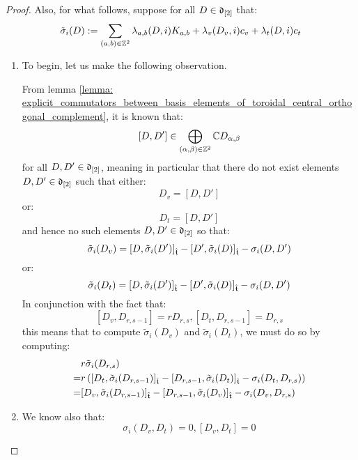 \begin{proof}
                Also, for what follows, suppose for all $D \in \mathfrak{d}_{[2]}$ that:
                    $$\tilde{\sigma}_i(D) := \sum_{(a, b) \in \mathbb{Z}^2} \lambda_{a, b}(D, i) K_{a, b} + \lambda_v(D_v, i) c_v + \lambda_t(D, i) c_t$$
                \begin{enumerate}
                    \item To begin, let us make the following observation.
                    
                    From lemma \ref{lemma: explicit_commutators_between_basis_elements_of_toroidal_central_orthogonal_complement}, it is known that:
                        $$[D, D'] \in \bigoplus_{(\alpha, \beta) \in \mathbb{Z}^2} \mathbb{C} D_{\alpha, \beta}$$
                    for all $D, D' \in \mathfrak{d}_{[2]}$, meaning in particular that there do not exist elements $D, D' \in \mathfrak{d}_{[2]}$ such that either:
                        $$D_v = [D, D']$$
                    or:
                        $$D_t = [D, D']$$
                    and hence no such elements $D, D' \in \mathfrak{d}_{[2]}$ so that:
                        $$\tilde{\sigma}_i(D_v) = [D, \tilde{\sigma}_i(D')]_{\hat{\mathfrak{t}}} - [D', \tilde{\sigma}_i(D)]_{\hat{\mathfrak{t}}} - \sigma_i(D, D')$$
                    or:
                        $$\tilde{\sigma}_i(D_t) = [D, \tilde{\sigma}_i(D')]_{\hat{\mathfrak{t}}} - [D', \tilde{\sigma}_i(D)]_{\hat{\mathfrak{t}}} - \sigma_i(D, D')$$
                    In conjunction with the fact that:
                        $$[D_v, D_{r, s - 1}] = r D_{r, s}, [D_t, D_{r, s - 1}] = D_{r, s}$$
                    this means that to compute $\tilde{\sigma}_i(D_v)$ and $\tilde{\sigma}_i(D_t)$, we must do so by computing:
                        $$
                            \begin{aligned}
                                & r\tilde{\sigma}_i(D_{r, s})
                                \\
                                = & r\left( [D_t, \tilde{\sigma}_i(D_{r, s - 1})]_{\hat{\mathfrak{t}}} - [D_{r, s - 1}, \tilde{\sigma}_i(D_t)]_{\hat{\mathfrak{t}}} - \sigma_i(D_t, D_{r, s}) \right)
                                \\
                                = & [D_v, \tilde{\sigma}_i(D_{r, s - 1})]_{\hat{\mathfrak{t}}} - [D_{r, s - 1}, \tilde{\sigma}_i(D_v)]_{\hat{\mathfrak{t}}} - \sigma_i(D_v, D_{r, s})
                            \end{aligned}
                        $$
                    \item We know also that:
                        $$\sigma_i(D_v, D_t) = 0, [D_v, D_t] = 0$$

\end{enumerate}
\end{proof}
